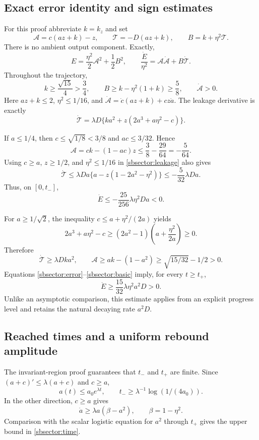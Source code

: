 \documentclass[10pt]{article}
\theoremstyle{remark}\newtheorem{remark}[theorem]{Remark}
\begin{document}
\subsection{Exact error identity and sign estimates}
For this proof abbreviate $k=k_z$ and set
\[
 \mathcal A=c(az+k)-z,
 \qquad \mathcal T=-D(az+k),
 \qquad B=k+\eta^2\mathcal T.
\]
There is no ambient output component. Exactly,
\begin{equation}\label{sbsector:error}
 E=\frac{\eta^2}{2}\mathcal A^2+\frac12B^2,
 \qquad
 \frac{\dot E}{\eta^2}
 =\mathcal A\dot{\mathcal A}+B\dot{\mathcal T}.
\end{equation}
Throughout the trajectory,
\begin{equation}\label{sbsector:basic}
 k\ge\frac{\sqrt{15}}4>\frac34,\qquad
 B\ge k-\eta^2(1+k)\ge\frac58,
 \qquad\dot{\mathcal A}>0.
\end{equation}
Here $az+k\le2$, $\eta^2\le1/16$, and
$\dot{\mathcal A}=\dot c(az+k)+cz\dot a$.
The leakage derivative is exactly
\begin{equation}\label{sbsector:leakage}
 \dot{\mathcal T}
 =\lambda D\{ka^2+z(2a^3+a\eta^2-c)\}.
\end{equation}

If $a\le1/4$, then
$c\le\sqrt{1/8}<3/8$ and $ac\le3/32$. Hence
\[
 \mathcal A=ck-(1-ac)z\le\frac38-\frac{29}{64}
 =-\frac5{64}.
\]
Using $c\ge a$, $z\ge1/2$, and $\eta^2\le1/16$ in
\eqref{sbsector:leakage} also gives
\[
 \dot{\mathcal T}
 \le\lambda Da\{a-z(1-2a^2-\eta^2)\}
 \le-\frac5{32}\lambda Da.
\]
Thus, on $[0,t_-]$,
\begin{equation}\label{sbsector:early-sign}
 \dot E\le-\frac{25}{256}\lambda\eta^2Da<0.
\end{equation}

For $a\ge1/\sqrt2$, the inequality
$c\le a+\eta^2/(2a)$ yields
\[
 2a^3+a\eta^2-c
 \ge(2a^2-1)\left(a+\frac{\eta^2}{2a}\right)\ge0.
\]
Therefore
\[
 \dot{\mathcal T}\ge\lambda Dka^2,
 \qquad
 \mathcal A\ge ak-(1-a^2)
 \ge\sqrt{15/32}-1/2>0.
\]
Equations \eqref{sbsector:error}--\eqref{sbsector:basic} imply, for
every $t\ge t_+$,
\begin{equation}\label{sbsector:late-sign}
 \dot E\ge\frac{15}{32}\lambda\eta^2a^2D>0.
\end{equation}
Unlike an asymptotic comparison, this estimate applies from an explicit
progress level and retains the natural decaying rate $a^2D$.

\subsection{Reached times and a uniform rebound amplitude}
The invariant-region proof guarantees that $t_-$ and $t_+$ are finite.
Since $(a+c)'\le\lambda(a+c)$ and $c\ge a$,
\[
 a(t)\le a_0e^{\lambda t},
 \qquad t_-\ge\lambda^{-1}\log(1/(4a_0)).
\]
In the other direction, $c\ge a$ gives
\[
 \dot a\ge\lambda a(\beta-a^2),\qquad \beta=1-\eta^2.
\]
Comparison with the scalar logistic equation for $a^2$ through $t_+$
gives the upper bound in \eqref{sbsector:time}.
\end{document}

